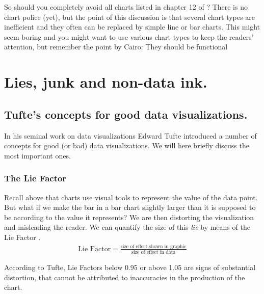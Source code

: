 \documentclass[
]{book}
\begin{document}
So should you completely avoid all charts listed in chapter 12 of \citep{few2012show} ? There is no chart police (yet), but the point of this discussion is that several chart types are inefficient and they often can be replaced by simple line or bar charts. This might seem boring and you might want to use various chart types to keep the readers' attention, but remember the point by Cairo: They should be functional

\hypertarget{lies-junk-and-non-data-ink.}{%
\section{Lies, junk and non-data ink.}\label{lies-junk-and-non-data-ink.}}

\hypertarget{tuftes-concepts-for-good-data-visualizations.}{%
\subsection*{Tufte's concepts for good data visualizations.}\label{tuftes-concepts-for-good-data-visualizations.}}

In his seminal work on data visualizations Edward Tufte introduced a number of concepts for good (or bad) data visualizations. We will here briefly discuss the most important ones.

\hypertarget{the-lie-factor}{%
\subsubsection*{The Lie Factor}\label{the-lie-factor}}

Recall above that charts use visual tools to represent the value of the data point. But what if we make the bar in a bar chart slightly larger than it is supposed to be according to the value it represents? We are then distorting the visualization and misleading the reader. We can quantify the size of this \emph{lie} by means of the Lie Factor \citep[p.~57 in][]{tufte2001visual}.
\begin{align}
    \text{Lie Factor}=\frac{\text{size of effect shown in graphic}}{\text{size of effect in data}}
\end{align}

According to Tufte, Lie Factors below 0.95 or above 1.05 are signs of substantial distortion, that cannot be attributed to inaccuracies in the production of the chart.
\end{document}

